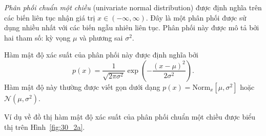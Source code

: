 \textit{Phân phối chuẩn một chiều} (univariate normal distribution) được định nghĩa trên các biến liên tục nhận giá
trị $x \in (-\infty, \infty)$. Đây là một phân phối được sử dụng nhiều nhất với
các biến ngẫu nhiên liên tục. Phân phối này được mô tả bởi hai tham số:
{kỳ vọng} $\mu$ và {phương sai} $\sigma^2$.

Hàm mật độ xác suất của phân phối này được định nghĩa bởi
\begin{equation}
\label{eqn:30_32}
p(x) = \frac{1}{\sqrt{2\pi \sigma^2}}\exp \left( -\frac{(x - \mu)^2}{2\sigma^2}\right).
\end{equation}
Hàm mật độ này thường được viết gọn dưới dạng $p(x) = \text{Norm}_x [\mu,
\sigma^2]$ hoặc $\mathcal{N}(\mu, \sigma^2)$.

Ví dụ về đồ thị hàm mật độ xác suất của phân phối chuẩn một chiều được biểu thị
trên Hình~\ref{fig:30_2a}.

